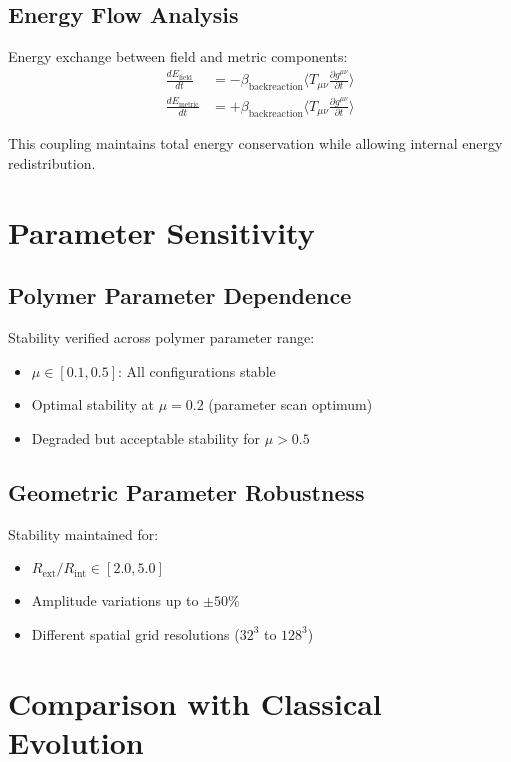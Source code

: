 \documentclass[11pt,a4paper]{article}
\begin{document}
\subsection{Energy Flow Analysis}

Energy exchange between field and metric components:
\begin{align}
\frac{dE_{\text{field}}}{dt} &= -\beta_{\text{backreaction}} \langle T_{\mu\nu} \frac{\partial g^{\mu\nu}}{\partial t} \rangle \\
\frac{dE_{\text{metric}}}{dt} &= +\beta_{\text{backreaction}} \langle T_{\mu\nu} \frac{\partial g^{\mu\nu}}{\partial t} \rangle
\end{align}

This coupling maintains total energy conservation while allowing internal energy redistribution.

\section{Parameter Sensitivity}

\subsection{Polymer Parameter Dependence}

Stability verified across polymer parameter range:
\begin{itemize}
\item $\mu \in [0.1, 0.5]$: All configurations stable
\item Optimal stability at $\mu = 0.2$ (parameter scan optimum)
\item Degraded but acceptable stability for $\mu > 0.5$
\end{itemize}

\subsection{Geometric Parameter Robustness}

Stability maintained for:
\begin{itemize}
\item $R_{\text{ext}}/R_{\text{int}} \in [2.0, 5.0]$
\item Amplitude variations up to $\pm 50\%$
\item Different spatial grid resolutions ($32^3$ to $128^3$)
\end{itemize}

\section{Comparison with Classical Evolution}
\end{document}
